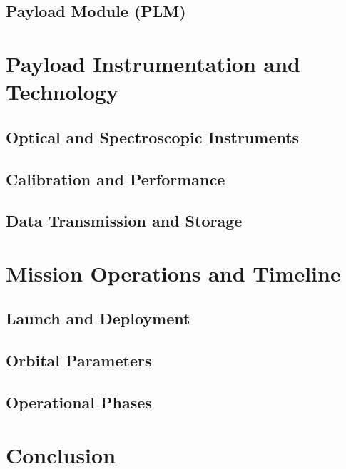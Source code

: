 \documentclass[12pt]{article}
\begin{document}
\subsection{Payload Module (PLM)}

\newpage

\section{Payload Instrumentation and Technology}

\subsection{Optical and Spectroscopic Instruments}


\subsection{Calibration and Performance}


\subsection{Data Transmission and Storage}

\newpage

\section{Mission Operations and Timeline}

\subsection{Launch and Deployment}


\subsection{Orbital Parameters}


\subsection{Operational Phases}


\newpage

\section{Conclusion}

\newpage

\end{document}
